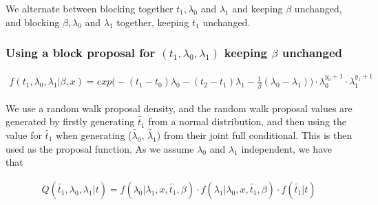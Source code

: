 
We alternate between blocking together $t_1, \lambda_0$ and  $ \lambda_1$ and keeping $\beta$ unchanged, and blocking $\beta, \lambda_0$ and $\lambda_1$ together, keeping $t_1$ unchanged.


\subsubsection{Using a block proposal for $(t_1, \lambda_0, \lambda_1)$ keeping $\beta$ unchanged}

\begin{align}
    f(t_1, \lambda_0, \lambda_1|\beta, x) = exp \Big( -(t_1-t_0)\lambda_0 -(t_2-t_1)\lambda_1 - \frac{1}{\beta}(\lambda_0 - \lambda_1)\Big) \cdot\lambda_0^{y_0 + 1} \cdot \lambda_1^{y_1 + 1} 
\end{align}

We use a random walk proposal density, and the random walk proposal values are generated by firstly generating $\widetilde{t_1}$ from a normal distribution, and then using the value for $\widetilde{t_1}$ when generating ($\widetilde{\lambda_0}$, $\widetilde{\lambda_1}$) from their joint full conditional. This is then used as the proposal function. As we assume $\lambda_0$ and $\lambda_1$ independent, we have that 

\begin{align}
    Q(\widetilde{t_1}, \lambda_0, \lambda_1 |t) = f(\lambda_0| \lambda_1, x, \widetilde{t_1}, \beta)\cdot f(\lambda_1| \lambda_0, x, \widetilde{t_1}, \beta)\cdot f(\widetilde{t_1}| t) \nonumber %
\end{align}

